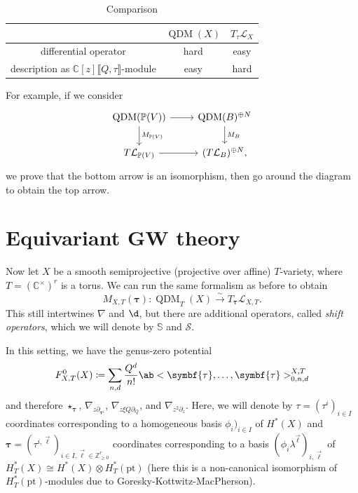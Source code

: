 \documentclass{amsart}
\theoremstyle{definition}
\theoremstyle{remark}
\theoremstyle{plain}
\theoremstyle{definition}
\theoremstyle{remark}
\newcommand{\C}{\mathbb{C}}
\newcommand{\Z}{\mathbb{Z}}
\newcommand{\bS}{\mathbb{S}}
\renewcommand{\P}{\mathbb{P}}
\renewcommand{\mc}[1]{\mathcal{#1}}
\newcommand{\btau}{\symbf{\tau}}
\newcommand{\mr}[1]{\mathrm{#1}}
\newcommand{\1}{\mathbf{1}}
\newcommand{\2}{\mathbf{2}}
\newcommand{\3}{\mathbf{3}}
\newcommand{\ps}[1]{\lBrack #1 \rBrack}
\DeclareMathOperator{\QDM}{QDM}
\begin{document}
\begin{table}[htpb]
    \centering
    \caption{Comparison}
    \label{tab:qdmvslagcone}

    \begin{tabular}{ccc}
        \toprule
        & \(\QDM(X)\) & \(T_{\tau} \mc{L}_X\) \\
        \midrule
        differential operator & hard & easy \\
        description as \(\C[z]\ps{Q,\tau}\)-module & easy & hard \\
        \bottomrule
    \end{tabular}
\end{table}
For example, if we consider
\begin{equation*}
\begin{tikzcd}
    \QDM(\P(V)) \ar{r} \ar{d}{M_{\P(V)}} & \QDM(B)^{\oplus N} \ar{d}{M_B} \\
    T \mc{L}_{\P(V)} \ar{r} & (T \mc{L}_B)^{\oplus N},
\end{tikzcd}
\end{equation*}
we prove that the bottom arrow is an isomorphism, then go around the diagram to obtain the top arrow.

\section{Equivariant GW theory}%
\label{sec:Equivariant GW theory}

Now let \(X\) be a smooth semiprojective (projective over affine) \(T\)-variety, where \(T = (\C^{\times})^r\) is a torus. We can run the same formalism as before to obtain 
\[ M_{X, T}(\btau) \colon \QDM_T(X) \xrightarrow{\sim} T_{\btau} \mc{L}_{X, T}. \]
This still intertwines \(\nabla\) and \(\d\), but there are additional operators, called \textit{shift operators}, which we will denote by \(\bS\) and \(\mc{S}\).

In this setting, we have the genus-zero potential
\[ F_{X, T}^0(X) \coloneqq \sum_{n, d} \frac{Q^d}{n!} \ab<\btau, \ldots, \btau>_{0,n,d}^{X,T} \]
and therefore \(\star_{\btau}\), \(\nabla_{z \partial_{\btau^i}}\), \(\nabla_{z \xi Q \partial_Q}\), and \(\nabla_{z^2 \partial_z}\). Here, we will denote by \(\tau = (\tau^i)_{i \in I}\) coordinates corresponding to a homogeneous basis \(\phi_i)_{i \in I}\) of \(H^*(X)\) and \(\btau = (\tau^{i, \vec{\ell}})_{i \in I, \vec{\ell} \in \Z_{\geq 0}^r}\) coordinates corresponding to a basis \((\phi_i \lambda^{\vec{\ell}})_{i, \vec{\ell}}\) of \(H_T^*(X) \cong H^*(X) \otimes H_T^*(\mr{pt})\) (here this is a non-canonical isomorphism of \(H_T^*(\mr{pt})\)-modules due to Goresky-Kottwitz-MacPherson).
\end{document}
